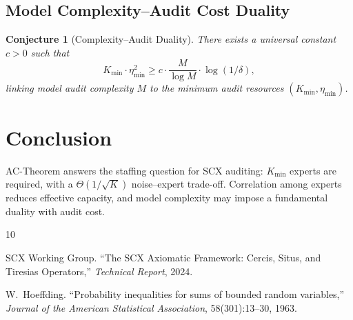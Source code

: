 \documentclass[12pt,a4paper]{article}
\newtheorem{conjecture}[theorem]{Conjecture}
\newcommand{\etamin}{\eta_{\min}}
\begin{document}
\subsection{Model Complexity--Audit Cost Duality}

\begin{conjecture}[Complexity--Audit Duality]
\label{conj:duality}
There exists a universal constant $c>0$ such that
\[
K_{\min} \cdot \etamin^2 \geq c \cdot \frac{M}{\log M} \cdot \log(1/\delta),
\]
linking model audit complexity $M$ to the minimum audit resources $(K_{\min}, \etamin)$.
\end{conjecture}

\section{Conclusion}

AC-Theorem answers the staffing question for \textsf{SCX} auditing: $K_{\min}$ experts are required, with a $\Theta(1/\sqrt{K})$ noise--expert trade-off. Correlation among experts reduces effective capacity, and model complexity may impose a fundamental duality with audit cost.


\begin{thebibliography}{10}

SCX Working Group.
\newblock ``The \textsf{SCX} Axiomatic Framework: Cercis, Situs, and Tiresias Operators,''
\newblock \emph{Technical Report}, 2024.

W.~Hoeffding.
\newblock ``Probability inequalities for sums of bounded random variables,''
\newblock \emph{Journal of the American Statistical Association}, 58(301):13--30, 1963.

\end{thebibliography}
\end{document}
